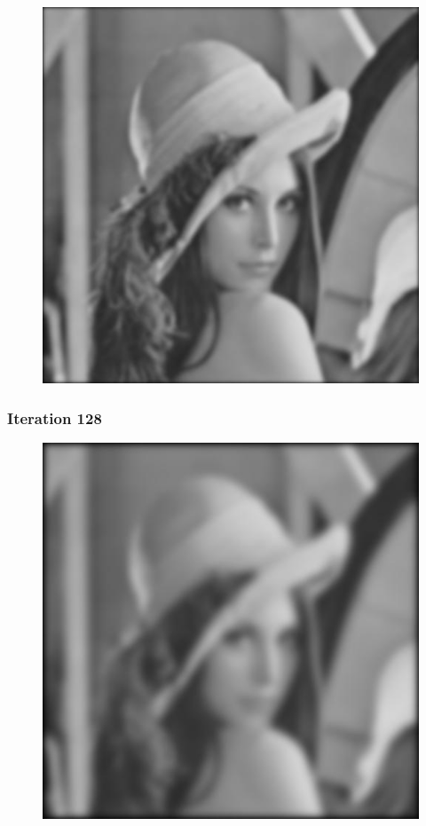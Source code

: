 \documentclass[11pt]{article}
\makeatletter
\def\maxwidth{\ifdim\Gin@nat@width>\linewidth\linewidth
    \else\Gin@nat@width\fi}
\let\Oldincludegraphics\includegraphics
\renewcommand{\includegraphics}[1]{\Oldincludegraphics[width=.8\maxwidth]{#1}}
\makeatother
\begin{document}
\begin{figure}[!htbp]
	\centering
	\includegraphics{"63th iterations_varying"}
	\label{fig:63th-iterationsvarying}
\end{figure}
\clearpage
    \hypertarget{iteration-128}{%
\subsubsection{Iteration 128}\label{iteration-128}}

\begin{figure}[!htbp]
	\centering
	\includegraphics{"127th iterations_varying"}
	\label{fig:127th-iterationsvarying}
\end{figure}


    
    
    
    
\end{document}
